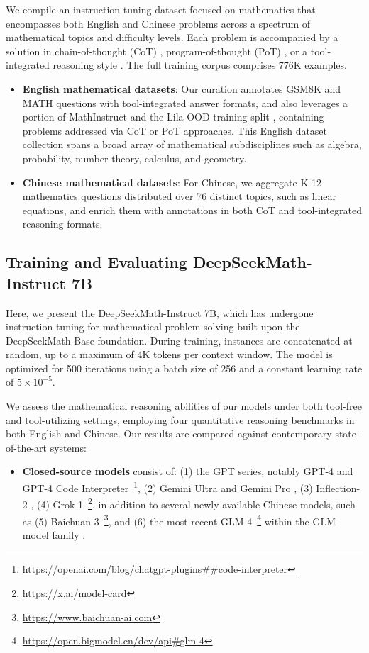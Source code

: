 \begin{itemize}[topsep=0pt]
We compile an instruction-tuning dataset focused on mathematics that encompasses both English and Chinese problems across a spectrum of mathematical topics and difficulty levels. Each problem is accompanied by a solution in chain-of-thought (CoT) \citep{cot}, program-of-thought (PoT) \citep{pot,pal}, or a tool-integrated reasoning style \citep{tora}. The full training corpus comprises 776K examples.

\begin{itemize}[topsep=0pt]
    \item \textbf{English mathematical datasets}: Our curation annotates GSM8K and MATH questions with tool-integrated answer formats, and also leverages a portion of MathInstruct \citep{MathInstruct} and the Lila-OOD training split \citep{lila}, containing problems addressed via CoT or PoT approaches. This English dataset collection spans a broad array of mathematical subdisciplines such as algebra, probability, number theory, calculus, and geometry.
    \item \textbf{Chinese mathematical datasets}: For Chinese, we aggregate K-12 mathematics questions distributed over 76 distinct topics, such as linear equations, and enrich them with annotations in both CoT and tool-integrated reasoning formats.
\end{itemize}

\subsection{Training and Evaluating DeepSeekMath-Instruct 7B}

Here, we present the DeepSeekMath-Instruct 7B, which has undergone instruction tuning for mathematical problem-solving built upon the DeepSeekMath-Base foundation. During training, instances are concatenated at random, up to a maximum of 4K tokens per context window. The model is optimized for 500 iterations using a batch size of 256 and a constant learning rate of $5\times10^{-5}$.

We assess the mathematical reasoning abilities of our models under both tool-free and tool-utilizing settings, employing four quantitative reasoning benchmarks in both English and Chinese. Our results are compared against contemporary state-of-the-art systems:

\begin{itemize}[topsep=0pt]
    \item \textbf{Closed-source models} consist of: (1) the GPT series, notably GPT-4 \citep{gpt4} and GPT-4 Code Interpreter~\footnote{\url{https://openai.com/blog/chatgpt-plugins\#\#code-interpreter}}, (2) Gemini Ultra and Gemini Pro \citep{gemini}, (3) Inflection-2 \citep{inflection-2}, (4) Grok-1~\footnote{\url{https://x.ai/model-card}}, in addition to several newly available Chinese models, such as (5) Baichuan-3~\footnote{\url{https://www.baichuan-ai.com}}, and (6) the most recent GLM-4~\footnote{\url{https://open.bigmodel.cn/dev/api\#glm-4}} within the GLM model family \citep{glm}.
\end{itemize}


\end{itemize}
